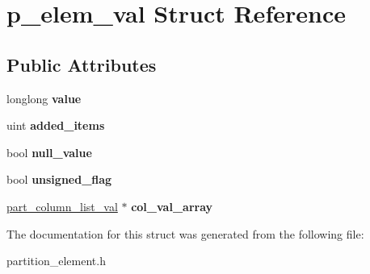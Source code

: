 \hypertarget{structp__elem__val}{}\section{p\+\_\+elem\+\_\+val Struct Reference}
\label{structp__elem__val}
\subsection*{Public Attributes}
\begin{DoxyCompactItemize}
\item 
\mbox{\label{structp__elem__val_ab2fb89f5772778384d91e9f441d0f014}} 
longlong {\bfseries value}
\item 
\mbox{\label{structp__elem__val_a3a853ca8b80eeec4f79bfef6e97feb8f}} 
uint {\bfseries added\+\_\+items}
\item 
\mbox{\label{structp__elem__val_a8f1b25a66b1de4a74d0c24cb43da98d4}} 
bool {\bfseries null\+\_\+value}
\item 
\mbox{\label{structp__elem__val_a447c5b6a2c4bd1295c0ec49fae3290f3}} 
bool {\bfseries unsigned\+\_\+flag}
\item 
\mbox{\label{structp__elem__val_a30e4ac0693f08bbec7d707176b503b99}} 
\mbox{\hyperlink{structp__column__list__val}{part\+\_\+column\+\_\+list\+\_\+val}} $\ast$ {\bfseries col\+\_\+val\+\_\+array}
\end{DoxyCompactItemize}


The documentation for this struct was generated from the following file\+:\begin{DoxyCompactItemize}
\item 
partition\+\_\+element.\+h\end{DoxyCompactItemize}
